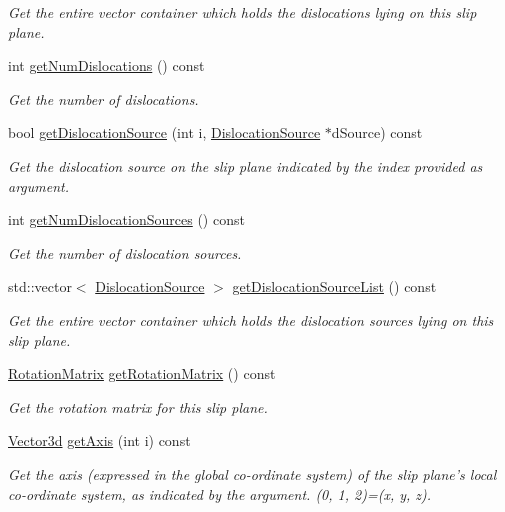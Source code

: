 \begin{DoxyCompactItemize}
\begin{DoxyCompactList}\small\item\em \-Get the entire vector container which holds the dislocations lying on this slip plane. \end{DoxyCompactList}\item 
int \hyperlink{classSlipPlane_a2a0f9231caee51d9a65a9bfa09e7dd31}{get\-Num\-Dislocations} () const 
\begin{DoxyCompactList}\small\item\em \-Get the number of dislocations. \end{DoxyCompactList}\item 
bool \hyperlink{classSlipPlane_ae2c01b55973912d6c0f7b077bfd7c1f5}{get\-Dislocation\-Source} (int i, \hyperlink{classDislocationSource}{\-Dislocation\-Source} $\ast$d\-Source) const 
\begin{DoxyCompactList}\small\item\em \-Get the dislocation source on the slip plane indicated by the index provided as argument. \end{DoxyCompactList}\item 
int \hyperlink{classSlipPlane_ad4f5bd8181c49601396d0b897501d544}{get\-Num\-Dislocation\-Sources} () const 
\begin{DoxyCompactList}\small\item\em \-Get the number of dislocation sources. \end{DoxyCompactList}\item 
std\-::vector$<$ \hyperlink{classDislocationSource}{\-Dislocation\-Source} $>$ \hyperlink{classSlipPlane_abd591180a3381b89d09ccd4b7aec1688}{get\-Dislocation\-Source\-List} () const 
\begin{DoxyCompactList}\small\item\em \-Get the entire vector container which holds the dislocation sources lying on this slip plane. \end{DoxyCompactList}\item 
\hyperlink{classRotationMatrix}{\-Rotation\-Matrix} \hyperlink{classSlipPlane_a774507778626c6a0fd72722c6781b652}{get\-Rotation\-Matrix} () const 
\begin{DoxyCompactList}\small\item\em \-Get the rotation matrix for this slip plane. \end{DoxyCompactList}\item 
\hyperlink{classVector3d}{\-Vector3d} \hyperlink{classSlipPlane_a83806b1e34cf044005d34920903e7074}{get\-Axis} (int i) const 
\begin{DoxyCompactList}\small\item\em \-Get the axis (expressed in the global co-\/ordinate system) of the slip plane's local co-\/ordinate system, as indicated by the argument. (0, 1, 2)=(x, y, z). \end{DoxyCompactList}\item 

\end{DoxyCompactItemize}

